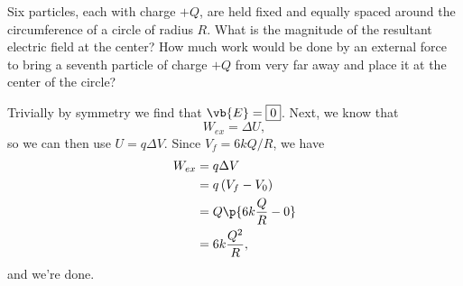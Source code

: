 \documentclass[11pt]{article}
\begin{document}
\begin{example}
    Six particles, each with charge $+Q$, are held fixed and equally spaced around the circumference of a circle of radius $R$. What is the magnitude of the resultant electric field at the center? How much work would be done by an external force to bring a seventh particle of charge $+Q$ from very far away and place it at the center of the circle?
\end{example}
\begin{solution}
    Trivially by symmetry we find that $\vb{E} = \boxed{0}$. Next, we know that
    \[W_{ex} = \Delta U,\]
    so we can then use $U = q\Delta V$. Since $V_f = 6kQ/R$, we have
    \begin{align*}
        W_{ex} &= q\Delta V \\
        &= q\left(V_f - V_0\right) \\
        &= Q\p{6k\frac{Q}{R}-0} \\
        &= 6k\frac{Q^2}{R},
    \end{align*}
    and we're done.
\end{solution}
\end{document}
